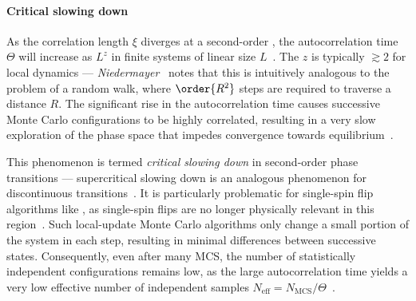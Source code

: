 \paragraph{Critical slowing down}
As the correlation length $\xi$ diverges at a second-order , the autocorrelation time $\Theta$ will increase as $L^z$ in finite systems of linear size $L$~\cite{NumericalDynamicalNiedermayer}.
The  $z$ is typically $\gtrsim 2$ for local dynamics --- \textit{Niedermayer}~\cite{niedermayer1988general} notes that this is intuitively analogous to the problem of a random walk, where $\order{R^2}$ steps are required to traverse a distance $R$.
The significant rise in the autocorrelation time causes successive Monte Carlo configurations to be highly correlated, resulting in a very slow exploration of the phase space that impedes convergence towards equilibrium~\cite{NumericalDynamicalNiedermayer,CompStatPhys,StatisticalMechanicsAlgorithmsComputations}. \\\par
This phenomenon is termed \emph{critical slowing down} in second-order phase transitions --- supercritical slowing down is an analogous phenomenon for discontinuous transitions~\cite{PhD_Reynal}.
It is particularly problematic for single-spin flip algorithms like , as single-spin flips are no longer physically relevant in this region~\cite{PhD_Reynal}.
Such local-update Monte Carlo algorithms only change a small portion of the system in each step, resulting in minimal differences between successive states.
Consequently, even after many MCS, the number of statistically independent configurations remains low, as the large autocorrelation time yields a very low effective number of independent samples $N_\mathrm{eff} = N_\mathrm{MCS}/\Theta$~\cite{niedermayer1988general,BeatCriticalSlowingDown1990}. \\\par

